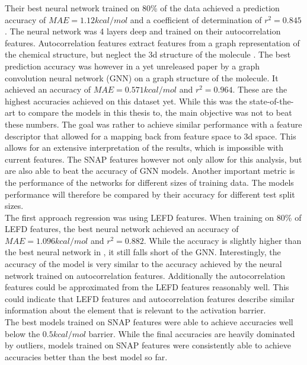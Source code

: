 Their best neural network trained on 80\% of the data achieved a prediction accuracy of $MAE = 1.12 kcal/mol$ and a 
coefficient of determination of $r^2 = 0.845$.
The neural network was 4 layers deep and trained on their autocorrelation features.
Autocorrelation features extract features from a graph representation of the chemical structure, but neglect the 
3d structure of the molecule \cite{friederich_dos}.
The best prediction accuracy was however in a yet unreleased paper by  a graph convolution neural network (GNN) on 
a graph structure of the molecule.
It achieved an accuracy of $MAE = 0.571 kcal/mol$ and $r^2=0.964$.
These are the highest accuracies achieved on this dataset yet.
While this was the state-of-the-art  to compare the models in this thesis to, the main objective was not to beat these numbers.
The goal was rather to achieve similar performance with a feature descriptor that allowed for a mapping back from feature space to 3d space.
This allows for an extensive interpretation of the results, which is impossible with current features.
The SNAP features however not only allow for this analysis, but are also able to beat the accuracy of GNN models.
Another important metric is the performance of the networks for different sizes of training data.
The models performance will therefore be compared by their accuracy for different test split sizes.
\\
The first approach regression was using LEFD features.
When training on 80\% of LEFD features, the best neural network achieved an accuracy of $MAE = 1.096 kcal/mol$ and $r^2=0.882$.
While the accuracy is slightly higher than the best neural network in \cite{friederich_dos}, it still falls short 
of the GNN.
Interestingly, the accuracy of the model is very similar to the accuracy achieved by the neural network trained on autocorrelation 
features.
Additionally the autocorrelation features could be approximated from the LEFD features reasonably well.
This could indicate that LEFD features and autocorrelation features describe
similar information about the element that is relevant to the activation barrier.
\\
The best models trained on SNAP features were able to achieve accuracies well below the $0.5 kcal/mol$ barrier.
While the final accuracies are heavily dominated by outliers, models trained on SNAP features were consistently
able to achieve accuracies better than the best model so far.
